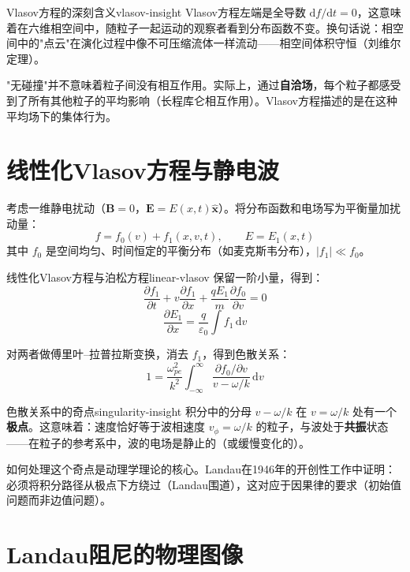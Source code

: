 \documentclass[12pt,a4paper,openany,oneside]{book}
\newcommand{\diff}{\mathrm{d}}
\newcommand{\eps}{\varepsilon}
\newcommand{\vect}[1]{\bm{#1}}
\newcommand{\unitvec}[1]{\hat{\vect{#1}}}
\newcommand{\difficulty}[1]{\marginnote{\textcolor{red}{\textbf{[#1]}}}}
\begin{document}
\begin{insight}{Vlasov方程的深刻含义}{vlasov-insight}
Vlasov方程左端是全导数 $\diff f/\diff t = 0$，这意味着在六维相空间中，随粒子一起运动的观察者看到分布函数不变。换句话说：相空间中的"点云"在演化过程中像不可压缩流体一样流动——相空间体积守恒（刘维尔定理）。

"无碰撞"并不意味着粒子间没有相互作用。实际上，通过\textbf{自洽场}，每个粒子都感受到了所有其他粒子的平均影响（长程库仑相互作用）。Vlasov方程描述的是在这种平均场下的集体行为。
\end{insight}

\section{线性化Vlasov方程与静电波}\difficulty{提高}

考虑一维静电扰动（$\vect{B}=0$，$\vect{E} = E(x,t)\unitvec{x}$）。将分布函数和电场写为平衡量加扰动量：
\[
f = f_0(v) + f_1(x,v,t), \qquad E = E_1(x,t)
\]
其中 $f_0$ 是空间均匀、时间恒定的平衡分布（如麦克斯韦分布），$|f_1| \ll f_0$。

\begin{theorem}{线性化Vlasov方程与泊松方程}{linear-vlasov}
保留一阶小量，得到：
\[
\frac{\partial f_1}{\partial t} + v\frac{\partial f_1}{\partial x} + \frac{qE_1}{m}\frac{\partial f_0}{\partial v} = 0
\]
\[
\frac{\partial E_1}{\partial x} = \frac{q}{\eps_0}\int f_1\,\diff v
\]

对两者做傅里叶--拉普拉斯变换，消去 $f_1$，得到色散关系：
\[
1 = \frac{\omega_{pe}^2}{k^2}\int_{-\infty}^{\infty} \frac{\partial f_0/\partial v}{v - \omega/k}\,\diff v
\]
\end{theorem}

\begin{insight}{色散关系中的奇点}{singularity-insight}
积分中的分母 $v - \omega/k$ 在 $v = \omega/k$ 处有一个\textbf{极点}。这意味着：速度恰好等于波相速度 $v_\phi = \omega/k$ 的粒子，与波处于\textbf{共振}状态——在粒子的参考系中，波的电场是静止的（或缓慢变化的）。

如何处理这个奇点是动理学理论的核心。Landau在1946年的开创性工作中证明：必须将积分路径从极点下方绕过（Landau围道），这对应于因果律的要求（初始值问题而非边值问题）。
\end{insight}

\section{Landau阻尼的物理图像}\difficulty{基础}
\end{document}
